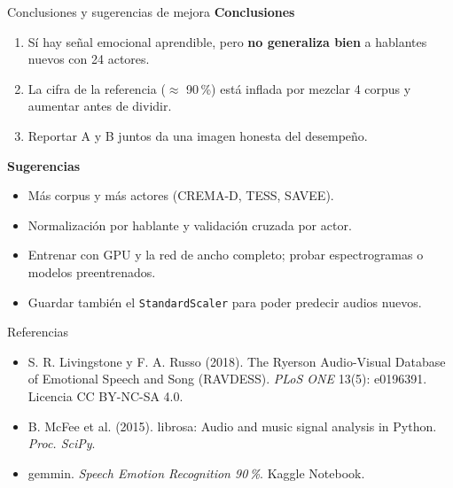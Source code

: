 \documentclass[aspectratio=169,11pt]{beamer}
\begin{document}
\begin{frame}{Conclusiones y sugerencias de mejora}
  \textbf{Conclusiones}
  \begin{enumerate}
    \item Sí hay señal emocional aprendible, pero \textbf{no generaliza bien} a hablantes nuevos con 24 actores.
    \item La cifra de la referencia ($\approx$ 90\,\%) está inflada por mezclar 4 corpus y aumentar antes de dividir.
    \item Reportar A y B juntos da una imagen honesta del desempeño.
  \end{enumerate}
  \vspace{0.4em}
  \textbf{Sugerencias}
  \begin{itemize}
    \item Más corpus y más actores (CREMA-D, TESS, SAVEE).
    \item Normalización por hablante y validación cruzada por actor.
    \item Entrenar con GPU y la red de ancho completo; probar espectrogramas o modelos preentrenados.
    \item Guardar también el \texttt{StandardScaler} para poder predecir audios nuevos.
  \end{itemize}
\end{frame}

\begin{frame}{Referencias}
  \begin{itemize}
    \item S. R. Livingstone y F. A. Russo (2018). The Ryerson Audio-Visual Database of Emotional Speech and
      Song (RAVDESS). \emph{PLoS ONE} 13(5): e0196391. Licencia CC BY-NC-SA 4.0.
    \item B. McFee et al. (2015). librosa: Audio and music signal analysis in Python. \emph{Proc. SciPy}.
    \item gemmin. \emph{Speech Emotion Recognition 90\,\%}. Kaggle Notebook.
  \end{itemize}
\end{frame}
\end{document}
